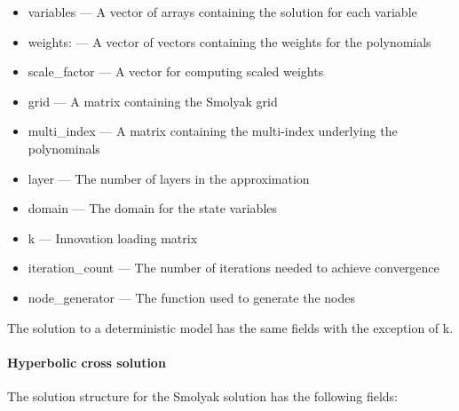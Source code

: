 \documentclass[notitlepage,11pt]{article}
\begin{document}
\begin{itemize}
\item variables --- A vector of arrays containing the solution for each
variable

\item weights: --- A vector of vectors containing the weights for the
polynomials

\item scale\_factor --- A vector for computing scaled weights

\item grid --- A matrix containing the Smolyak grid

\item multi\_index --- A matrix containing the multi-index underlying the
polynominals

\item layer --- The number of layers in the approximation

\item domain --- The domain for the state variables

\item k --- Innovation loading matrix

\item iteration\_count --- The number of iterations needed to achieve
convergence

\item node\_generator --- The function used to generate the nodes
\end{itemize}

The solution to a deterministic model has the same fields with the exception
of k.

\paragraph{Hyperbolic cross solution}

The solution structure for the Smolyak solution has the following fields:
\end{document}
